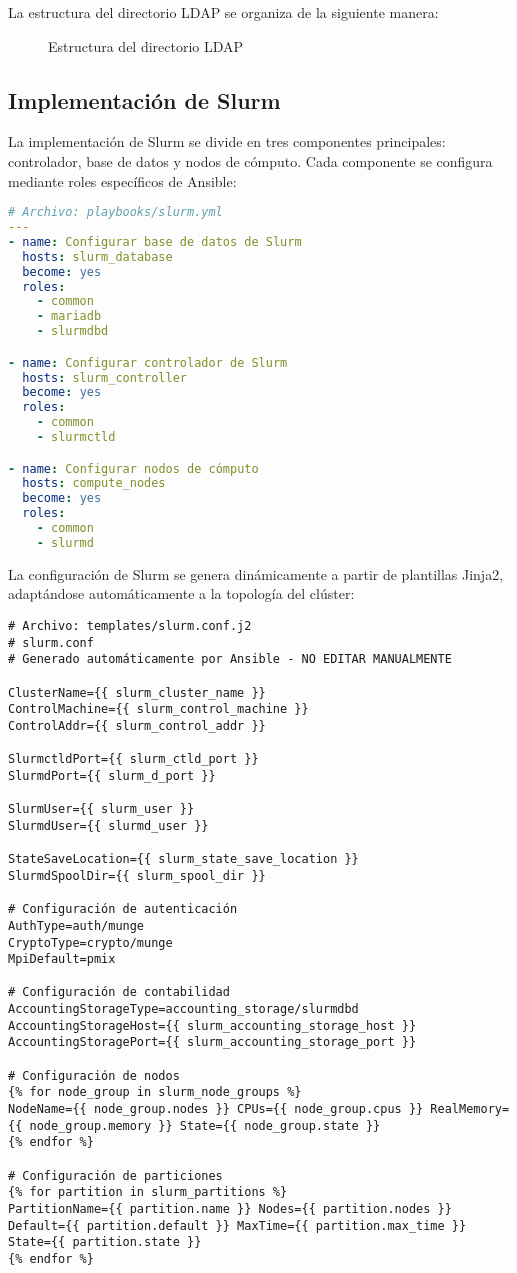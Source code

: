 \documentclass[12pt,a4paper]{report}
\begin{document}
La estructura del directorio LDAP se organiza de la siguiente manera:

\begin{figure}[H]
\centering
\caption{Estructura del directorio LDAP}
\label{fig:ldap_structure_impl}
\end{figure}

\subsection{Implementación de Slurm}

La implementación de Slurm se divide en tres componentes principales: controlador, base de datos y nodos de cómputo. Cada componente se configura mediante roles específicos de Ansible:

\begin{lstlisting}[language=yaml]
# Archivo: playbooks/slurm.yml
---
- name: Configurar base de datos de Slurm
  hosts: slurm_database
  become: yes
  roles:
    - common
    - mariadb
    - slurmdbd

- name: Configurar controlador de Slurm
  hosts: slurm_controller
  become: yes
  roles:
    - common
    - slurmctld

- name: Configurar nodos de cómputo
  hosts: compute_nodes
  become: yes
  roles:
    - common
    - slurmd
\end{lstlisting}

La configuración de Slurm se genera dinámicamente a partir de plantillas Jinja2, adaptándose automáticamente a la topología del clúster:

\begin{lstlisting}
# Archivo: templates/slurm.conf.j2
# slurm.conf
# Generado automáticamente por Ansible - NO EDITAR MANUALMENTE

ClusterName={{ slurm_cluster_name }}
ControlMachine={{ slurm_control_machine }}
ControlAddr={{ slurm_control_addr }}

SlurmctldPort={{ slurm_ctld_port }}
SlurmdPort={{ slurm_d_port }}

SlurmUser={{ slurm_user }}
SlurmdUser={{ slurmd_user }}

StateSaveLocation={{ slurm_state_save_location }}
SlurmdSpoolDir={{ slurm_spool_dir }}

# Configuración de autenticación
AuthType=auth/munge
CryptoType=crypto/munge
MpiDefault=pmix

# Configuración de contabilidad
AccountingStorageType=accounting_storage/slurmdbd
AccountingStorageHost={{ slurm_accounting_storage_host }}
AccountingStoragePort={{ slurm_accounting_storage_port }}

# Configuración de nodos
{% for node_group in slurm_node_groups %}
NodeName={{ node_group.nodes }} CPUs={{ node_group.cpus }} RealMemory={{ node_group.memory }} State={{ node_group.state }}
{% endfor %}

# Configuración de particiones
{% for partition in slurm_partitions %}
PartitionName={{ partition.name }} Nodes={{ partition.nodes }} Default={{ partition.default }} MaxTime={{ partition.max_time }} State={{ partition.state }}
{% endfor %}
\end{lstlisting}
\end{document}
